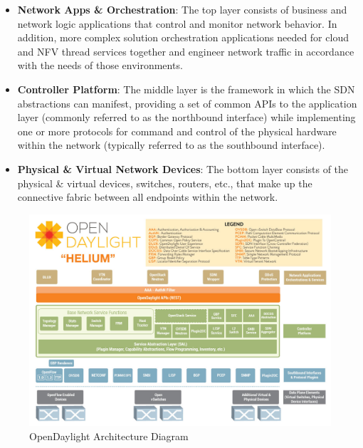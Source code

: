 \documentclass[a4paper, 12pt]{book}
\begin{document}
\begin{itemize}\itemsep0pt
\item{\textbf{Network Apps \& Orchestration}}: The top layer consists of business and network logic applications that control and monitor network behavior. In addition, more complex solution orchestration applications needed for cloud and NFV thread services together and engineer network traffic in accordance with the needs of those environments.
\item{\textbf{Controller Platform}}: The middle layer is the framework in which the SDN abstractions can manifest, providing a set of common APIs to the application layer (commonly referred to as the northbound interface) while implementing one or more protocols for command and control of the physical hardware within the network (typically referred to as the southbound interface).
\item{\textbf{Physical \& Virtual Network Devices}}: The bottom layer consists of the physical \& virtual devices, switches, routers, etc., that make up the connective fabric between all endpoints within the network.
\end{itemize}

\begin{center}
 \begin{figure}
 \begin{center}
   \includegraphics[width=15cm]{img/odl-technologies-01.png}
   \caption{OpenDaylight Architecture Diagram}
   \label{fig:odl_tech_diagram}
 \end{center}
 \end{figure}
\end{center}
\end{document}
